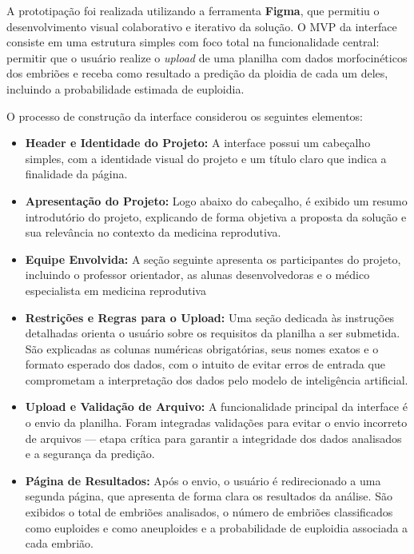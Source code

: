 A prototipação foi realizada utilizando a ferramenta \textbf{Figma}, que permitiu o desenvolvimento visual colaborativo e iterativo da solução. O MVP da interface consiste em uma estrutura simples com foco total na funcionalidade central: permitir que o usuário realize o \textit{upload} de uma planilha com dados morfocinéticos dos embriões e receba como resultado a predição da ploidia de cada um deles, incluindo a probabilidade estimada de euploidia.

O processo de construção da interface considerou os seguintes elementos:
\begin{itemize}
    \item \textbf{Header e Identidade do Projeto:} A interface possui um cabeçalho simples, com a identidade visual do projeto e um título claro que indica a finalidade da página.

    \item \textbf{Apresentação do Projeto:} Logo abaixo do cabeçalho, é exibido um resumo introdutório do projeto, explicando de forma objetiva a proposta da solução e sua relevância no contexto da medicina reprodutiva.

    \item \textbf{Equipe Envolvida:} A seção seguinte apresenta os participantes do projeto, incluindo o professor orientador, as alunas desenvolvedoras e o médico especialista em medicina reprodutiva

    \item \textbf{Restrições e Regras para o Upload:} Uma seção dedicada às instruções detalhadas orienta o usuário sobre os requisitos da planilha a ser submetida. São explicadas as colunas numéricas obrigatórias, seus nomes exatos e o formato esperado dos dados, com o intuito de evitar erros de entrada que comprometam a interpretação dos dados pelo modelo de inteligência artificial.

    \item \textbf{Upload e Validação de Arquivo:} A funcionalidade principal da interface é o envio da planilha. Foram integradas validações para evitar o envio incorreto de arquivos — etapa crítica para garantir a integridade dos dados analisados e a segurança da predição.

    \item \textbf{Página de Resultados:} Após o envio, o usuário é redirecionado a uma segunda página, que apresenta de forma clara os resultados da análise. São exibidos o total de embriões analisados, o número de embriões classificados como euploides e como aneuploides e a probabilidade de euploidia associada a cada embrião.

\end{itemize}

